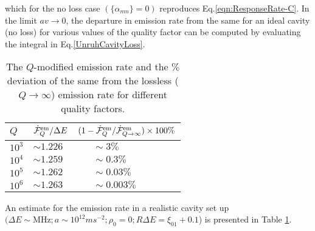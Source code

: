 \documentclass[aps,prl,nofootinbib,preprintnumbers,floatfix,twocolumn,superscriptaddress]{revtex4}
\begin{document}
which for the no loss case $(\{\alpha_{mn}\}=0)$ reproduces Eq.\ref{eqn:ResponseRate-C}. 
In the limit $av\to0$, 
the departure in emission rate from the same for an ideal cavity (no loss) for various values of the quality factor 
can be computed by evaluating the 
integral in Eq.\eqref{UnruhCavityLoss}. 
\begin{table} [h!]
\centering
\begin{tabular}{|l|l|l|}
\hline
 $Q$ & ${\dot {\cal F}}^{\text{em}}_Q/\Delta E$ & 
 $(1-{\dot {\cal F}}^{\text{em}}_Q/{\dot {\cal F}}^{\text{em}}_{Q\to\infty})\times100 \%$ \\ \hline
 $10^3$ &$\sim 1.226 $ & $~~~~~~~\sim 3\%$ \\ \hline
 $10^4$ &$\sim 1.259 $ & $~~~~~~~\sim 0.3\%$\\ \hline 
 $10^5$ &$\sim 1.262 $ & $~~~~~~~\sim 0.03\%$\\ \hline 
 $10^6$ &$\sim 1.263 $ & $~~~~~~~\sim 0.003\%$ \\ 
\hline   
\end{tabular}
\caption{The $Q$-modified emission rate and the $\%$ deviation of the same from the lossless ($Q\to\infty$) 
emission rate for different quality factors.}
\label{table:1}
\end{table}
An estimate for the emission rate
in a realistic cavity set up 
$(\Delta E \sim  \text{MHz}; a \sim 10^{12} ms^{-2};\rho_0=0; R\Delta E =\xi_{01} + 0.1 $) 
is presented in Table \ref{table:1}.
\end{document}
